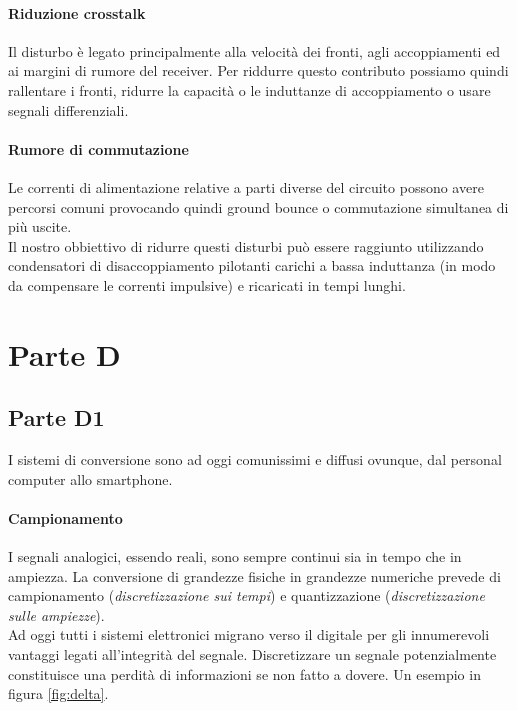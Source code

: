 \documentclass[12pt]{article}
\begin{document}
\paragraph{Riduzione crosstalk} Il disturbo è legato principalmente alla velocità dei fronti, agli accoppiamenti ed ai margini di rumore del receiver. Per riddurre questo contributo possiamo quindi rallentare i fronti, ridurre la capacità o le induttanze di accoppiamento o usare segnali differenziali.
\paragraph{Rumore di commutazione} Le correnti di alimentazione relative a parti diverse del circuito possono avere percorsi comuni provocando quindi ground bounce o commutazione simultanea di più uscite.\\
Il nostro obbiettivo di ridurre questi disturbi può essere raggiunto utilizzando condensatori di disaccoppiamento pilotanti carichi a bassa induttanza (in modo da compensare le correnti impulsive) e ricaricati in tempi lunghi.

\section{Parte D}\label{d}
\subsection{Parte D1}\label{d1} %
I sistemi di conversione sono ad oggi comunissimi e diffusi ovunque, dal personal computer allo smartphone.
\paragraph{Campionamento} I segnali analogici, essendo reali, sono sempre continui sia in tempo che in ampiezza. La conversione di grandezze fisiche in grandezze numeriche prevede di campionamento (\textit{discretizzazione sui tempi}) e quantizzazione (\textit{discretizzazione sulle ampiezze}).\\
Ad oggi tutti i sistemi elettronici migrano verso il digitale per gli innumerevoli vantaggi legati all'integrità del segnale. Discretizzare un segnale potenzialmente constituisce una perdità di informazioni se non fatto a dovere. Un esempio in figura \ref{fig:delta}.
\end{document}
